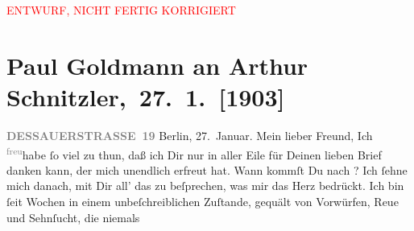 
\begin{center}
            \textcolor{red}{ENTWURF, NICHT FERTIG KORRIGIERT}
                      \end{center}
            
         
         \renewcommand{\erwaehntePersonen}{Personen: Olga Schnitzler, ?? [Besitzer des Palasthotels Berlin, Anfang 1903]}
         \renewcommand{\erwaehnteInstitutionen}{Institutionen: Palasthotel Berlin}
         \renewcommand{\erwaehnteOrte}{Orte: Berlin, Dessauer Straße, Palasthotel Berlin, Wien}
         \renewcommand{\erwaehnteWerke}{}
               \section[ Paul Goldmann an Arthur Schnitzler, 27. 1. {[}1903{]}]{ Paul Goldmann an Arthur Schnitzler, 27. 1. {[}1903{]}}\nopagebreak{}\rehead{ }\begin{ledgroupsized}[t]{13cm}\normalsize\beginnumbering \toendnotes[C]{\smallbreak\pagebreak[2]} 
\toendnotes[C]{\smallbreak}\pstart
           \noindent{}\raggedleft{}{\pb}\textcolor{gray}{\textbf{DESSAUERSTRASSE 19}}\pend
           \pstart
           Berlin, 27. Januar.\pend
           \pstart\center{}Mein lieber Freund,\pend\pstart
           Ich \substVorne{}\textsuperscript{\textcolor{gray}{freu}}\substDazwischen{}habe\substHinten{} ſo viel zu thun, daß ich Dir nur in aller Eile für Deinen lieben Brief
               danken kann, der mich unendlich erfreut hat. Wann kommſt Du nach \label{K_L03361-1v}\label{K_L03361-1h}? Ich ſehne mich danach, mit
               Dir all’ das zu beſprechen, was mir das Herz bedrückt. Ich bin ſeit Wochen in einem
               unbeſchreiblichen Zuſtande, gequält von Vorwürfen, Reue und Sehnſucht, die niemals

\end{ledgroupsized}
